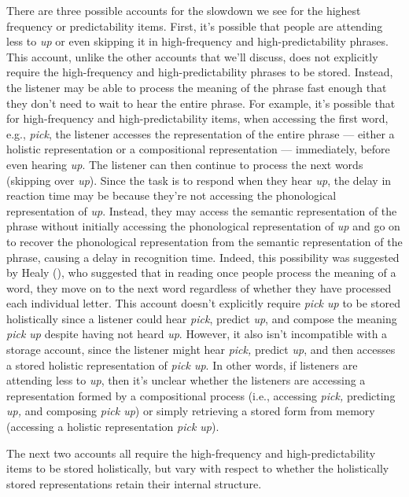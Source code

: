 \documentclass[
  12pt,
  letterpaper,
]{scrreport}
\begin{document}
There are three possible accounts for the slowdown we see for the
highest frequency or predictability items. First, it's possible that
people are attending less to \emph{up} or even skipping it in
high-frequency and high-predictability phrases. This account, unlike the
other accounts that we'll discuss, does not explicitly require the
high-frequency and high-predictability phrases to be stored. Instead,
the listener may be able to process the meaning of the phrase fast
enough that they don't need to wait to hear the entire phrase. For
example, it's possible that for high-frequency and high-predictability
items, when accessing the first word, e.g., \emph{pick}, the listener
accesses the representation of the entire phrase --- either a holistic
representation or a compositional representation --- immediately, before
even hearing \emph{up}. The listener can then continue to process the
next words (skipping over \emph{up}). Since the task is to respond when
they hear \emph{up}, the delay in reaction time may be because they're
not accessing the phonological representation of \emph{up}. Instead,
they may access the semantic representation of the phrase without
initially accessing the phonological representation of \emph{up} and go
on to recover the phonological representation from the semantic
representation of the phrase, causing a delay in recognition time.
Indeed, this possibility was suggested by Healy
(), who suggested that
in reading once people process the meaning of a word, they move on to
the next word regardless of whether they have processed each individual
letter. This account doesn't explicitly require \emph{pick up} to be
stored holistically since a listener could hear \emph{pick}, predict
\emph{up}, and compose the meaning \emph{pick up} despite having not
heard \emph{up}. However, it also isn't incompatible with a storage
account, since the listener might hear \emph{pick,} predict \emph{up},
and then accesses a stored holistic representation of \emph{pick up}. In
other words, if listeners are attending less to \emph{up}, then it's
unclear whether the listeners are accessing a representation formed by a
compositional process (i.e., accessing \emph{pick,} predicting
\emph{up,} and composing \emph{pick up}) or simply retrieving a stored
form from memory (accessing a holistic representation \emph{pick up}).

The next two accounts all require the high-frequency and
high-predictability items to be stored holistically, but vary with
respect to whether the holistically stored representations retain their
internal structure.
\end{document}
